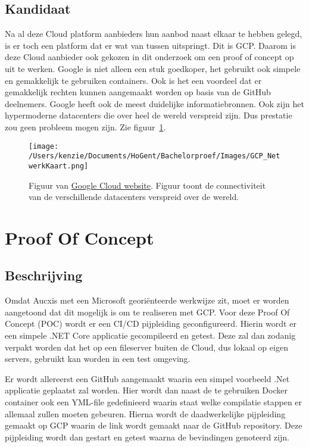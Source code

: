 \subsection{Kandidaat}
Na al deze Cloud platform aanbieders hun aanbod naast elkaar te hebben gelegd, is er toch een platform dat er wat van tussen uitspringt. Dit is GCP. Daarom is deze Cloud aanbieder ook gekozen in dit onderzoek om een proof of concept op uit te werken. Google is niet alleen een stuk goedkoper, het gebruikt ook simpele en gemakkelijk te gebruiken containers. Ook is het een voordeel dat er gemakkelijk rechten kunnen aangemaakt worden op basis van de GitHub deelnemers. Google heeft ook de meest duidelijke informatiebronnen. Ook zijn het hypermoderne datacenters die over heel de wereld verspreid zijn. Dus prestatie zou geen probleem mogen zijn. Zie figuur~\ref{fig:GCP_NetwerkKaart}.

\begin{figure}[!htbp]
    \centering
    \texttt{[image: /Users/kenzie/Documents/HoGent/Bachelorproef/Images/GCP\_NetwerkKaart.png]}
    \caption{Figuur van \href{}{Google Cloud website}. Figuur toont de connectiviteit van de verschillende datacenters verspreid over de wereld.}
    \label{fig:GCP_NetwerkKaart}
\end{figure}

\section{Proof Of Concept}
\subsection{Beschrijving}
Omdat Aucxis met een Microsoft georiënteerde werkwijze zit, moet er worden aangetoond dat dit mogelijk is om te realiseren met GCP. Voor deze Proof Of Concept (POC) wordt er een CI/CD pijpleiding geconfigureerd. Hierin wordt er een simpele .NET Core applicatie gecompileerd en getest. Deze zal dan zodanig verpakt worden dat het op een fileserver buiten de Cloud, dus lokaal op eigen servers, gebruikt kan worden in een test omgeving.

Er wordt allereerst een GitHub aangemaakt waarin een simpel voorbeeld .Net applicatie geplaatst zal worden. Hier wordt dan naast de te gebruiken Docker container ook een YML-file gedefinieerd waarin staat welke compilatie stappen er allemaal zullen moeten gebeuren. Hierna wordt de daadwerkelijke pijpleiding gemaakt op GCP waarin de link wordt gemaakt naar de GitHub repository. Deze pijpleiding wordt dan gestart en getest waarna de bevindingen genoteerd zijn.

